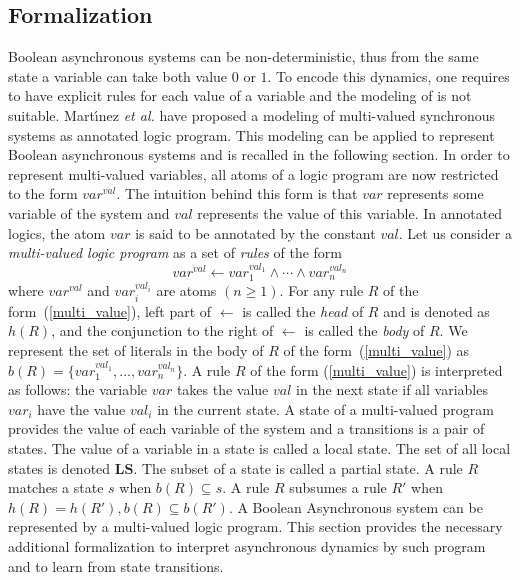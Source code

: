 \subsection{Formalization}
    
	Boolean asynchronous systems can be non-deterministic, thus from the same state a variable can take both value $0$ or $1$.
	To encode this dynamics, one requires to have explicit rules for each value of a variable and the modeling of \cite{ribeiro2015learning} is not suitable.
	Mart{\'\i}nez \textit{et al.} \cite{DMTRICLP15} have proposed a modeling of multi-valued synchronous systems as annotated logic program.
    This modeling can be applied to represent Boolean asynchronous systems and is recalled in the following section.
	In order to represent multi-valued variables, all atoms of a logic program are now restricted to the form $var^{val}$.
	The intuition behind this form is that $var$ represents some variable of the system and $val$ represents the value of this variable.
	In annotated logics, the atom $var$ is said to be annotated by the constant $val$.
	Let us consider a {\it multi-valued logic program\/} as a set of {\it rules\/} of the form  
	\begin{equation}\label{multi_value}
		var^{val} \leftarrow var_1^{val_1} \wedge \cdots \wedge var_n^{val_n}
	\end{equation}
	where $var^{val}$ and $var_i^{val_i}$ are atoms $(n \geq 1)$.
	For any rule $R$ of the form~(\ref{multi_value}), left part of $\leftarrow$ is called the {\it head\/} of $R$ and is denoted as $h(R)$,
	and the conjunction to the right of $\leftarrow$ is called the {\it body\/} of $R$.  
	We represent the set of literals in the body of $R$ of the form~(\ref{multi_value}) as $b(R)=\{var_1^{val_1},\ldots,var_n^{val_n}\}$. 
	A rule $R$ of the form (\ref{multi_value}) is interpreted as follows:
	the variable $var$ takes the value $val$ in the next state if all variables $var_i$ have the value $val_i$ in the current state.
	A state of a multi-valued program provides the value of each variable of the system and a transitions is a pair of states.
	The value of a variable in a state is called a local state.
	The set of all local states is denoted $\mathbf{LS}$.
	The subset of a state is called a partial state.
	A rule $R$ matches a state $s$ when $b(R) \subseteq s$.
	A rule $R$ subsumes a rule $R'$ when $h(R)=h(R'), b(R) \subseteq b(R')$.
%
A Boolean Asynchronous system can be represented by a multi-valued logic program.
This section provides the necessary additional formalization to interpret asynchronous dynamics by such program and to learn from state transitions.

